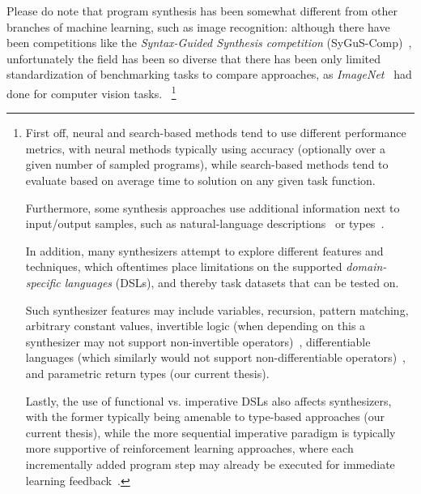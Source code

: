 \documentclass{article}
\begin{document}
Please do note that program synthesis has been somewhat different
from other branches of machine learning, such as image recognition:
although there have been competitions like the
\emph{Syntax-Guided Synthesis competition} (SyGuS-Comp)~\citep{sygus},
unfortunately the field has been so diverse that there has been only limited
standardization of benchmarking tasks to compare approaches,
as \emph{ImageNet}~\citep{deng2009imagenet} had done for computer vision tasks.%
~\footnote{
    First off, neural and search-based methods tend to use different performance metrics,
    with neural methods typically using accuracy (optionally over a given number of sampled programs),
    while search-based methods tend to evaluate based on average time to solution on any given task function.

    Furthermore, some synthesis approaches use additional information next to input/output samples,
    such as natural-language descriptions~\citep{polosukhin2018neural} or types~\citep{myth}.

    In addition, many synthesizers attempt to explore different features and techniques,
    which oftentimes place limitations on the supported \emph{domain-specific languages} (DSLs),
    and thereby task datasets that can be tested on.

    Such synthesizer features may include
    variables, recursion, pattern matching, arbitrary constant values,
    invertible logic (when depending on this a synthesizer may not support non-invertible operators)~\citep{flashmeta,prose},
    differentiable languages (which similarly would not support non-differentiable operators)~\citep{forth,terpret,houdini,feser2016differentiable,rocktaschel2017end,abadi2019simple},
    and parametric return types (our current thesis).

    Lastly, the use of functional vs. imperative DSLs also affects synthesizers,
    with the former typically being amenable to type-based approaches (our current thesis),
    while the more sequential imperative paradigm is typically more supportive of reinforcement learning approaches,
    where each incrementally added program step may already be executed for immediate learning feedback~\citep{npi,alphanpi}.

}
\end{document}
